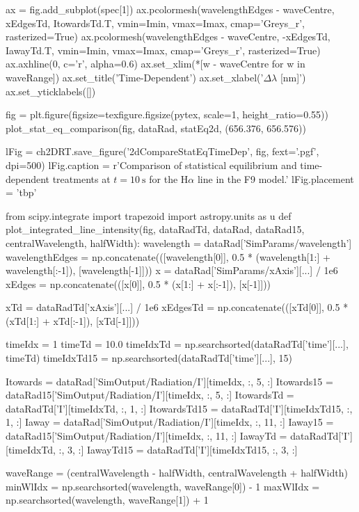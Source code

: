 \begin{pycode}[2DRT]
    ax = fig.add_subplot(spec[1])
    ax.pcolormesh(wavelengthEdges - waveCentre, xEdgesTd, ItowardsTd.T, vmin=Imin, vmax=Imax, cmap='Greys_r', rasterized=True)
    ax.pcolormesh(wavelengthEdges - waveCentre, -xEdgesTd, IawayTd.T, vmin=Imin, vmax=Imax, cmap='Greys_r', rasterized=True)
    ax.axhline(0, c='r', alpha=0.6)
    ax.set_xlim(*[w - waveCentre for w in waveRange])
    ax.set_title('Time-Dependent')
    ax.set_xlabel('$\Delta\lambda$ [nm]')
    ax.set_yticklabels([])

fig = plt.figure(figsize=texfigure.figsize(pytex, scale=1, height_ratio=0.55))
plot_stat_eq_comparison(fig, dataRad, statEq2d, (656.376, 656.576))

lFig = ch2DRT.save_figure('2dCompareStatEqTimeDep', fig, fext='.pgf', dpi=500)
lFig.caption = r'Comparison of statistical equilibrium and time-dependent treatments at $t=\SI{10}{\second}$ for the H$\alpha$ line in the F9 model.'
lFig.placement = 'tbp'

from scipy.integrate import trapezoid
import astropy.units as u
def plot_integrated_line_intensity(fig, dataRadTd, dataRad, dataRad15, centralWavelength, halfWidth):
    wavelength = dataRad['SimParams/wavelength']
    wavelengthEdges = np.concatenate(([wavelength[0]], 0.5 * (wavelength[1:] + wavelength[:-1]), [wavelength[-1]]))
    x = dataRad['SimParams/xAxis'][...] / 1e6
    xEdges = np.concatenate(([x[0]], 0.5 * (x[1:] + x[:-1]), [x[-1]]))

    xTd = dataRadTd['xAxis'][...] / 1e6
    xEdgesTd = np.concatenate(([xTd[0]], 0.5 * (xTd[1:] + xTd[:-1]), [xTd[-1]]))

    timeIdx = 1
    timeTd = 10.0
    timeIdxTd = np.searchsorted(dataRadTd['time'][...], timeTd)
    timeIdxTd15 = np.searchsorted(dataRadTd['time'][...], 15)

    Itowards = dataRad['SimOutput/Radiation/I'][timeIdx, :, 5, :]
    Itowards15 = dataRad15['SimOutput/Radiation/I'][timeIdx, :, 5, :]
    ItowardsTd = dataRadTd['I'][timeIdxTd, :, 1, :]
    ItowardsTd15 = dataRadTd['I'][timeIdxTd15, :, 1, :]
    Iaway = dataRad['SimOutput/Radiation/I'][timeIdx, :, 11, :]
    Iaway15 = dataRad15['SimOutput/Radiation/I'][timeIdx, :, 11, :]
    IawayTd = dataRadTd['I'][timeIdxTd, :, 3, :]
    IawayTd15 = dataRadTd['I'][timeIdxTd15, :, 3, :]

    waveRange = (centralWavelength - halfWidth, centralWavelength + halfWidth)
    minWlIdx = np.searchsorted(wavelength, waveRange[0]) - 1
    maxWlIdx = np.searchsorted(wavelength, waveRange[1]) + 1


\end{pycode}
